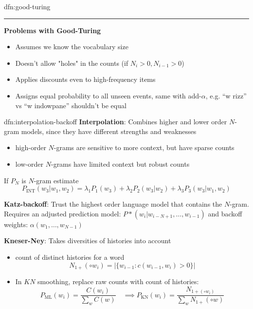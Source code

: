 \documentclass[landscape, 8pt]{extarticle}
\begin{document}
\begin{multicols}{3}
\begin{dfn}{dfn:good-turing}{}
    \noindent\rule{\textwidth}{0.2pt}
    \textbf{Problems with Good-Turing}
    \begin{itemize}
        \setlength\itemsep{0em}
        \item Assumes we know the vocabulary size
        \item Doesn't allow "holes" in the counts (if $N_{i}>0,N_{i-1}>0$)
        \item Applies discounts even to high-frequency items
        \item Assigns equal probability to all unseen events, same with add-$\alpha$, e.g. ``w rizz'' vs ``w indowpane'' shouldn't be equal
    \end{itemize}
\end{dfn}

\begin{dfn}{dfn:interpolation-backoff}{}
    \textbf{Interpolation}: Combines higher and lower order $N$-gram models, since they have different strengths and weaknesses
    \begin{itemize}[leftmargin=*]
        \setlength\itemsep{0em}
        \item high-order $N$-grams are sensitive to more context, but have sparse counts
        \item low-order $N$-grams have limited context but robust counts
    \end{itemize}

    If $P_{N}$ is $N$-gram estimate
    \[P_{\text{INT}}(w_{3}|w_{1},w_{2}) = \lambda_{1}P_{1}(w_{3}) + \lambda_{2}P_{2}(w_{3}|w_{2}) + \lambda_{3}P_{3}(w_{3}|w_{1},w_{2})\]

    \textbf{Katz-backoff}: Trust the highest order language model that contains the $N$-gram. Requires an adjusted prediction model: $P*(w_{i}|w_{i-N+1},\dots,w_{i-1})$ and backoff weights: $\alpha(w_{1},\dots,w_{N-1})$
        
    \textbf{Kneser-Ney}: Takes diversities of histories into account
    \begin{itemize}
        \setlength\itemsep{0em}
        \item count of distinct histories for a word
            \[N_{1+}(\circ w_{i}) = \lvert \{w_{i-1} : c(w_{i-1}, w_{i}) > 0\} \rvert\]
        \item In $KN$ smoothing, replace raw counts with count of histories:
            \[P_{\text{ML}}(w_{i}) = \frac{C(w_{i})}{\sum_{w}C(w)} \quad \implies P_{\text{KN}}(w_{i}) = \frac{N_{1+(\circ w_{i})}}{\sum_{w} N_{1+}(\circ w)}\]
    \end{itemize}


\end{dfn}
\end{multicols}
\end{document}
